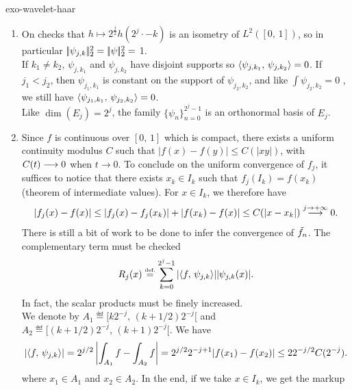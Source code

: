  
\begin{correction}{exo-wavelet-haar}
\begin{enumerate}
\item {}      On checks that $ h \mapsto 2^{\frac{j}{2}} h (2^j \cdot - k) $ is an isometry of $ L^2 ([0, \, 1]) $, so in particular $ |\!| \psi_{j, k} |\!|_2^2 = |\!| \psi |\!|_2^2 = $ 1. \\If $ k_1 \neq k_2 $, $ \psi_{j, k_1} $ and $ \psi_{j, k_2} $ have disjoint supports so $ \langle \psi_{j, k_1},\,\psi_{j, k_2}\rangle = 0 $. If $ j_1 <j_2 $, then $ \psi_{j_1, k_1} $ is constant on the support of $ \psi_{j_2, k_2} $, and like $ \int{\psi_{j_2, k_2}} = 0 $ , we still have $ \langle \psi_{j_1, k_1},\,\psi_{j_2, k_2}\rangle = 0 $. \\Like $ \dim (E_j) = 2^j $, the family $ \{\psi_n\}_{n = 0}^{2^j-1} $ is an orthonormal basis of $ E_j $.
\item Since $ f $ is continuous over $ [0, \, 1] $ which is compact, there exists a uniform continuity modulus $ C $ such that $ | f(x) -f(y) | \leq C (| xy |) $, with $ C (t) \overset{}{\longrightarrow} 0 $ when $ t \to 0 $. To conclude on the uniform convergence of $ f_j $, it suffices to notice that there exists $ x_k \in I_k $ such that $ f_j (I_k) = f(x_k) $ (theorem of intermediate values). For $ x \in I_k $, we therefore have
\begin{equation*}
| f_j (x) -f(x) | \leq | f_j (x) -f_j (x_k) | + | f(x_k) -f(x) | \leq C (| x-x_k |) \overset{j \to +\infty}{\longrightarrow} 0.
\end{equation*}
There is still a bit of work to be done to infer the convergence of $ \tilde{f_n} $. The complementary term must be checked
\begin{equation*}
R_j (x) \stackrel{\mbox{\upshape\tiny def.}}{=} \sum_{k = 0}^{2^j-1}{| \langle f,\,\psi_{j, k}\rangle | | \psi_{j, k} (x) |}.
\end{equation*}
In fact, the scalar products must be finely increased. \\We denote by $ A_1 \eqdef [k 2^{- j}, \, (k+1/2) 2^{- j}[$ and $ A_2 \eqdef [(k+1/2) 2^{-j}, \, (k+1) 2^{- j}[$. We have
\begin{equation*}
| \langle f,\,\psi_{j, k}\rangle | = 2^{j/2} \left| \int_{A_1}{f} - \int_{A_2}{f} \right| = 2^{j/2} 2^{- j+1} | f(x_1) -f(x_2) | \leq 2 2^{- j/2} C (2^{- j}).
\end{equation*}
where $ x_1 \in A_1 $ and $ x_2 \in A_2 $. In the end, if we take $ x \in I_k $, we get the markup
\begin{equation*}

\end{equation*}
\end{enumerate}
\end{correction}
